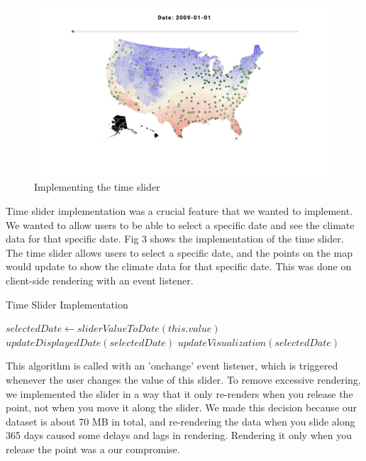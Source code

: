 \documentclass[10pt,twocolumn,twoside]{opticajnl}
\begin{document}
\begin{figure}
    \centering
    \includegraphics[scale=0.10]{images/img3.png}
    \caption{Implementing the time slider}
\end{figure}

Time slider implementation was a crucial feature that we wanted to implement. We wanted to allow users to be able to select a specific date and see the climate data for that specific date. Fig 3 shows the implementation of the time slider. The time slider allows users to select a specific date, and the points on the map would update to show the climate data for that specific date. This was done on client-side rendering with an event listener.

\begin{algorithm}
    \caption{Time Slider Implementation}
    \begin{algorithmic}[1]
    \State $selectedDate \gets sliderValueToDate(this.value)$
    \State $updateDisplayedDate(selectedDate)$
    \State $updateVisualization(selectedDate)$
    \EndProcedure
    \end{algorithmic}
\end{algorithm}

This algorithm is called with an 'onchange' event listener, which is triggered whenever the user changes the value of this slider. To remove excessive rendering, we implemented the slider in a way that it only re-renders when you release the point, not when you move it along the slider. We made this decision because our dataset is about 70 MB in total, and re-rendering the data when you slide along 365 days caused some delays and lags in rendering. Rendering it only when you release the point was a our compromise.
\end{document}
